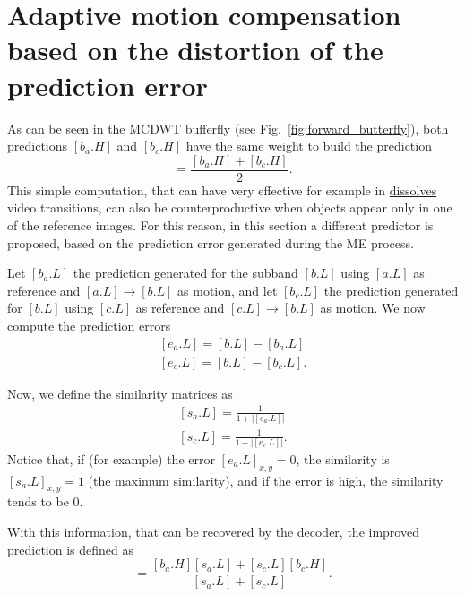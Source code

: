 \section{Adaptive motion compensation based on the distortion of the prediction error}
As can be seen in the MCDWT bufferfly (see
Fig.~\ref{fig:forward_butterfly}), both predictions $[b_a.H]$ and
$[b_c.H]$ have the same weight to build the prediction
\begin{equation}
  [\hat{b.H}] = \frac{[b_a.H] + [b_c.H]}{2}.
\end{equation}
This simple computation, that can have very effective for example in
\href{https://biteable.com/blog/tips/video-transitions-effects-examples/}{dissolves}
video transitions, can also be counterproductive when objects appear
only in one of the reference images. For this reason, in this section
a different predictor is proposed, based on the prediction error
generated during the ME process.

Let $[b_a.L]$ the prediction generated for the subband $[b.L]$ using
$[a.L]$ as reference and $[a.L]\rightarrow [b.L]$ as motion, and let
$[b_c.L]$ the prediction generated for $[b.L]$ using $[c.L]$ as
reference and $[c.L]\rightarrow [b.L]$ as motion. We now compute the
prediction errors
\begin{equation}
  \begin{array}{l}
    {[e_a.L]} = [b.L] - [b_a.L]\\
    {[e_c.L]} = [b.L] - [b_c.L].
  \end{array}
\end{equation}

Now, we define the similarity matrices as
\begin{equation}
  \begin{array}{l}
    {[s_a.L]} = \frac{1}{1+{|[e_a.L]|}}\\
    {[s_c.L]} = \frac{1}{1+{|[e_c.L]|}}.    
  \end{array}
  \label{eq:weighted_prediction}
\end{equation}
Notice that, if (for example) the error $[e_a.L]_{x,y}=0$, the
similarity is $[s_a.L]_{x,y}=1$ (the maximum similarity), and if the
error is high, the similarity tends to be $0$.

With this information, that can be recovered by the decoder, the
improved prediction is defined as
\begin{equation}
  [\hat{b.H}] = \frac{[b_a.H][s_a.L]+[s_c.L][b_c.H]}{[s_a.L]+[s_c.L]}.
\end{equation}

